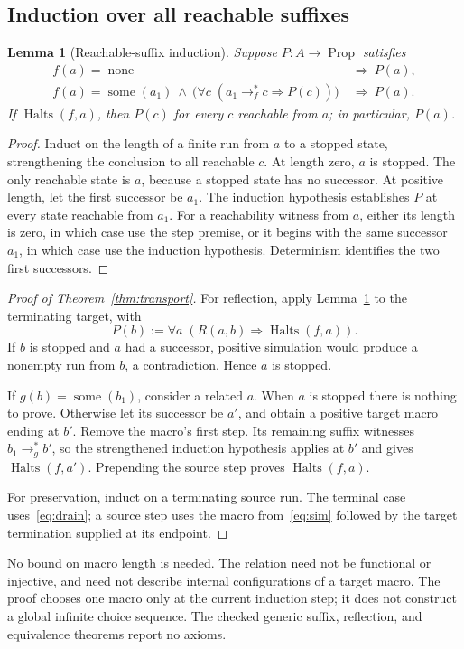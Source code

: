 \documentclass[11pt,a4paper]{article}
\newcommand{\Halts}{\operatorname{Halts}}
\newcommand{\some}{\operatorname{some}}
\newcommand{\none}{\operatorname{none}}
\newtheorem{lemma}[theorem]{Lemma}
\theoremstyle{remark}
\begin{document}
\subsection{Induction over all reachable suffixes}
\begin{lemma}[Reachable-suffix induction]
\label{lem:suffix}
Suppose \(P:A\to\operatorname{Prop}\) satisfies
\begin{align*}
 f(a)=\none &\ \Longrightarrow\ P(a),\\
 f(a)=\some(a_1)\ \land\
   \bigl(\forall c\;(a_1\to_f^*c\Rightarrow P(c))\bigr)
   &\ \Longrightarrow\ P(a).
\end{align*}
If \(\Halts(f,a)\), then \(P(c)\) for every \(c\) reachable from \(a\);
in particular, \(P(a)\).
\end{lemma}
\begin{proof}
Induct on the length of a finite run from \(a\) to a stopped state,
strengthening the conclusion to all reachable \(c\).
At length zero, \(a\) is stopped. The only reachable state is \(a\),
because a stopped state has no successor.
At positive length, let the first successor be \(a_1\).
The induction hypothesis establishes \(P\) at every state reachable from
\(a_1\). For a reachability witness from \(a\), either its length is zero,
in which case use the step premise, or it begins with the same successor
\(a_1\), in which case use the induction hypothesis.
Determinism identifies the two first successors.
\end{proof}

\begin{proof}[Proof of Theorem~\ref{thm:transport}]
For reflection, apply Lemma~\ref{lem:suffix} to the terminating target, with
\[
 P(b):=\forall a\;(R(a,b)\Rightarrow\Halts(f,a)).
\]
If \(b\) is stopped and \(a\) had a successor, positive simulation would
produce a nonempty run from \(b\), a contradiction. Hence \(a\) is stopped.

If \(g(b)=\some(b_1)\), consider a related \(a\).
When \(a\) is stopped there is nothing to prove. Otherwise let its successor
be \(a'\), and obtain a positive target macro ending at \(b'\).
Remove the macro's first step. Its remaining suffix witnesses
\(b_1\to_g^*b'\), so the strengthened induction hypothesis applies at
\(b'\) and gives \(\Halts(f,a')\). Prepending the source step proves
\(\Halts(f,a)\).

For preservation, induct on a terminating source run.
The terminal case uses~\eqref{eq:drain}; a source step uses the macro
from~\eqref{eq:sim} followed by the target termination supplied at its endpoint.
\end{proof}
No bound on macro length is needed. The relation need not be functional or
injective, and need not describe internal configurations of a target macro.
The proof chooses one macro only at the current induction step; it does not
construct a global infinite choice sequence. The checked generic suffix,
reflection, and equivalence theorems report no axioms.
\end{document}
